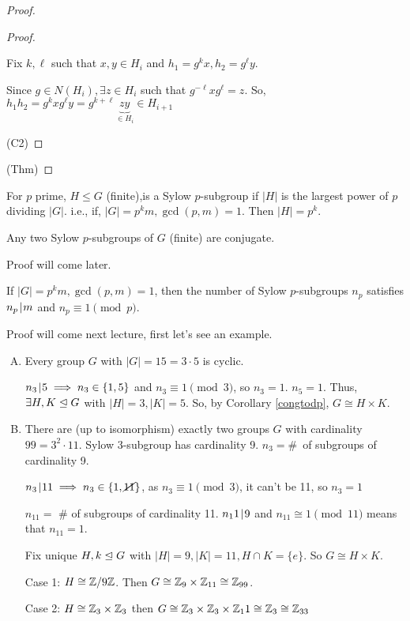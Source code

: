 \documentclass[notes.tex]{subfiles}
\begin{document}
\begin{proof}
\begin{proof}
\begin{itemize}
		Fix $k, \ell $ such that $x, y \in H_i$ and $h_1 = g^kx, h_2 = g^\ell y$.

		Since $g\in N(H_i), \exists z\in H_i$ such that $g^{-\ell}xg^\ell = z$.
		So, $h_1h_2 = g^kxg^\ell y = g^{k+\ell}\underbrace{zy}_{\in H_i} \in H_{i+1}$ 
	\end{itemize}
	\qedhere(C2)
	\end{proof}
	\qedhere(Thm)
\end{proof}

\begin{defn}
	For $p$ prime, $H\le G$ (finite),is a Sylow $p$-subgroup if $|H|$ is the largest power of $p$ dividing $|G|$.
	i.e., if, $|G| = p^km, \gcd(p, m) = 1$. Then $|H| = p^k$.
\end{defn}

\begin{theorem}[Sylow 2]
\label{sylow2} Any two Sylow $p$-subgroups of $G$ (finite) are conjugate.
\end{theorem}
Proof will come later.

\begin{theorem}[Sylow 3]
	\label{sylow3}
	If $|G| = p^km, \gcd(p, m) = 1$, then the number of Sylow $p$-subgroups $n_p$ satisfies $n_p \mkern2mu|\mkern1mu m$ and $n_p\equiv 1 \pmod p$. 
\end{theorem}

Proof will come next lecture, first let's see an example.
\begin{eg}\leavevmode
	\begin{enumerate}[A)]
		\item Every group $G$ with $|G| = 15 = 3\cdot 5$ is cyclic.

		$n_3 \mkern2mu|\mkern1mu 5 \implies n_3 \in \{1, 5\}$ and $n_3 \equiv 1 \pmod 3$, so $n_3 = 1$.
		$n_5 = 1$. Thus, $\exists H, K\trianglelefteq G$ with $|H| = 3, |K| = 5$. So, by Corollary \ref{congtodp}, $G\cong H\times K$.
		\item There are (up to isomorphism) exactly two groups $G$ with cardinality $99 = 3^2\cdot 11$.
		Sylow 3-subgroup has cardinality 9. $n_3 = $\#~of subgroups of cardinality 9.

		$n_3 \mkern2mu|\mkern1mu 11\implies n_3\in \{1, \cancel{11}\}$, as $n_3 \equiv 1\pmod 3$, it can't be 11, so $n_3 = 1$

		$n_{11} = $ \# of subgroups of cardinality 11. $n_11 \mkern2mu|\mkern1mu 9$ and $n_11\cong 1 \pmod 11$ means that $n_{11} = 1$.

		Fix unique $H, k\trianglelefteq G$ with $|H| = 9, |K| = 11, H\cap K = \{e\}$.
		So $G \cong H\times K$.

		Case 1: $H\cong \mathbb{Z}/9\mathbb{Z}$. Then $G\cong \mathbb{Z}_9\times \mathbb{Z}_{11} \cong \mathbb{Z}_{99}$.

		Case 2: $H\cong \mathbb{Z}_3\times \mathbb{Z}_3$ then $G \cong \mathbb{Z}_3\times\mathbb{Z}_3 \times \mathbb{Z}_11\cong \mathbb{Z}_3\cong \mathbb{Z}_{33}$
	\end{enumerate}
	
\end{eg}
\end{document}
